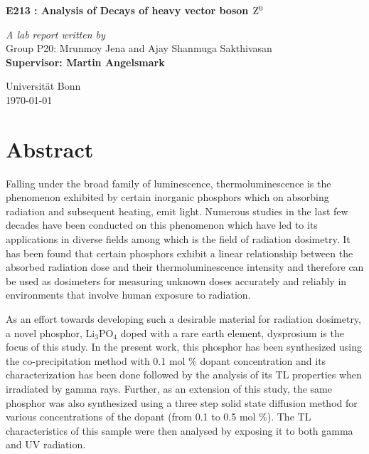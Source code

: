 \documentclass[a4paper]{report}
\begin{document}
\begin{onehalfspace}
\vspace*{0.5in}
\begin{center}
\begin{LARGE}
\textbf{E213 : Analysis of Decays of heavy vector boson $\rm Z^{0}$}\\ 
\end{LARGE}
\bigskip
\bigskip
\textit{A lab report written by}\\
Group P20: Mrunmoy Jena and Ajay Shanmuga Sakthivasan\\
\medskip
\textbf{Supervisor: Martin Angelsmark}\\
\vspace*{5in}
\begin{flushright}
Universit\"{a}t	Bonn\\
\today
\end{flushright}
\end{center}
\newpage
{
  \tableofcontents
}

\chapter*{Abstract}
Falling under the broad family of luminescence, thermoluminescence is the phenomenon exhibited by certain inorganic phosphors which on absorbing radiation and subsequent heating, emit light. Numerous studies in the last few decades have been conducted on this phenomenon which have led to its applications in diverse fields among which is the field of radiation dosimetry. It has been found that certain phosphors exhibit a linear relationship between the absorbed radiation dose and their thermoluminescence intensity and therefore can be used as dosimeters for measuring unknown doses accurately and reliably in environments that involve human exposure to radiation. 

As an effort towards developing such a desirable material for radiation dosimetry, a novel phosphor, $\mathrm{Li_{3}PO_{4}}$ doped with a rare earth element, dysprosium is the focus of this study. In the present work, this phosphor has been synthesized using the co-precipitation method with 0.1 mol \% dopant concentration and its characterization has been done followed by the analysis of its TL properties when irradiated by gamma rays. Further, as an extension of this study, the same phosphor was also synthesized using a three step solid state diffusion method for various concentrations of the dopant (from 0.1 to 0.5 mol \%). The TL characteristics of this sample were then analysed by exposing it to both gamma and UV radiation.

\end{onehalfspace}
\end{document}
